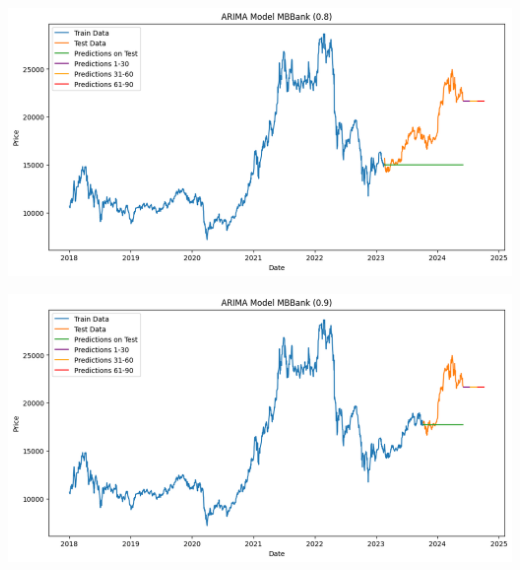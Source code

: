 \documentclass[conference]{IEEEtran}
\begin{document}
\begin{minipage}{0.21\textwidth}
    \centering
    \includegraphics[width=\linewidth]{images/ARIMA/ARIMA_MBB_82.png}
    \label{fig:image1}
\end{minipage}
\hfill
\begin{minipage}{0.21\textwidth}
    \centering
    \includegraphics[width=\linewidth]{images/ARIMA/ARIMA_MBB_91.png}
    \label{fig:image2}
\end{minipage}
\end{document}
